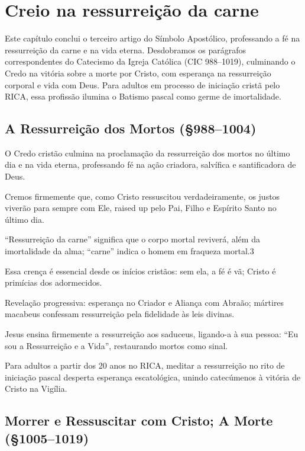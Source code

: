 \chapter{Creio na ressurreição da carne}

Este capítulo conclui o terceiro artigo do Símbolo Apostólico, professando a fé na ressurreição da carne e na vida eterna. Desdobramos os parágrafos correspondentes do Catecismo da Igreja Católica (CIC 988--1019), culminando o Credo na vitória sobre a morte por Cristo, com esperança na ressurreição corporal e vida com Deus. Para adultos em processo de iniciação cristã pelo RICA, essa profissão ilumina o Batismo pascal como germe de imortalidade.

\section{A Ressurreição dos Mortos (\S 988--1004)}

O Credo cristão culmina na proclamação da ressurreição dos mortos no último dia e na vida eterna, professando fé na ação criadora, salvífica e santificadora de Deus.

Cremos firmemente que, como Cristo ressuscitou verdadeiramente, os justos viverão para sempre com Ele, raised up pelo Pai, Filho e Espírito Santo no último dia.

``Ressurreição da carne'' significa que o corpo mortal reviverá, além da imortalidade da alma; ``carne'' indica o homem em fraqueza mortal.3

Essa crença é essencial desde os inícios cristãos: sem ela, a fé é vã; Cristo é primícias dos adormecidos.

Revelação progressiva: esperança no Criador e Aliança com Abraão; mártires macabeus confessam ressurreição pela fidelidade às leis divinas.

Jesus ensina firmemente a ressurreição aos saduceus, ligando-a à sua pessoa: ``Eu sou a Ressurreição e a Vida'', restaurando mortos como sinal.

Para adultos a partir dos 20 anos no RICA, meditar a ressurreição no rito de iniciação pascal desperta esperança escatológica, unindo catecúmenos à vitória de Cristo na Vigília.

\section{Morrer e Ressuscitar com Cristo; A Morte (\S 1005--1019)}


